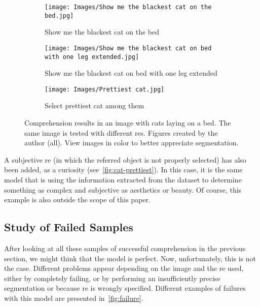 \begin{figure}[p]
  \bigskip
  \begin{subfigure}[t]{.3\textwidth}
    \centering
    \caption{Show me the blackest cat on the bed}
    \texttt{[image: Images/Show me the blackest cat on the bed.jpg]}
  \end{subfigure}\hfill
  \begin{subfigure}[t]{.3\textwidth}
    \centering
    \caption{Show me the blackest cat on bed with one leg extended}
    \texttt{[image: Images/Show me the blackest cat on bed with one leg extended.jpg]}
  \end{subfigure}\hfill
  \begin{subfigure}[t]{.3\textwidth}
    \centering
    \caption{Select prettiest cat among them}\label{fig:cat-prettiest}
    \texttt{[image: Images/Prettiest cat.jpg]}
  \end{subfigure}
  \caption[Comprehension results in an image with cats]{Comprehension results
    in an image with cats laying on a bed. The same image is tested with
    different \glspl{re}. Figures created by the author (all). View images in
    color to better appreciate segmentation.}%
  \label{fig:cats}
\end{figure}

A subjective \gls{re} (in which the referred object is not properly selected)
has also been added, as a curiosity (see\ \vref{fig:cat-prettiest}). In this
case, it is the same model that is using the information extracted from the
dataset to determine something as complex and subjective as aesthetics or
beauty. Of course, this example is also outside the scope of this paper.


\subsection{Study of Failed Samples}\label{sec:failed}

After looking at all these samples of successful comprehension in the previous
section, we might think that the model is perfect. Now, unfortunately, this is
not the case. Different problems appear depending on the image and the \gls{re}
used, either by completely failing, or by performing an insufficiently precise
segmentation or because \gls{re} is wrongly specified. Different examples of
failures with this model are presented in\ \vref{fig:failure}.

